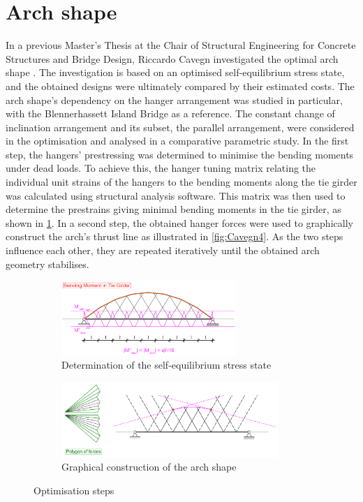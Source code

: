 \section{Arch shape} \label{sec:rev_prev}
In a previous Master's Thesis at the Chair of Structural Engineering for Concrete Structures and Bridge Design, Riccardo Cavegn investigated the optimal arch shape \cite{Cavegn}. The investigation is based on an optimised self-equilibrium stress state, and the obtained designs were ultimately compared by their estimated costs. The arch shape's dependency on the hanger arrangement was studied in particular, with the Blennerhassett Island Bridge as a reference. The constant change of inclination arrangement and its subset, the parallel arrangement, were considered in the optimisation and analysed in a comparative parametric study. 
In the first step, the hangers' prestressing was determined to minimise the bending moments under dead loads. To achieve this, the hanger tuning matrix relating the individual unit strains of the hangers to the bending moments along the tie girder was calculated using structural analysis software. This matrix was then used to determine the prestrains giving minimal bending moments in the tie girder, as shown in \cref{fig:Cavegn3}. In a second step, the obtained hanger forces were used to graphically construct the arch's thrust line as illustrated in \autoref{fig:Cavegn4}. As the two steps influence each other, they are repeated iteratively until the obtained arch geometry stabilises.
\begin{figure}[H]
\centering
\begin{subfigure}{0.5\textwidth}
    \centering
    \includegraphics[width=0.73\textwidth]{Pictures/OptimizedBendingMoment.PNG}
    \caption{Determination of the self-equilibrium stress state}
    \label{fig:Cavegn3}
\end{subfigure}%
\begin{subfigure}{.5\textwidth}
    \centering
    \includegraphics[width=0.9\textwidth]{Pictures/GraphicalThrustLineConstruction.PNG}
    \caption{Graphical construction of the arch shape}
    \label{fig:Cavegn4}
\end{subfigure}
\caption{Optimisation steps \cite{Cavegn}}
\label{fig:Cavegn34}
\end{figure}
